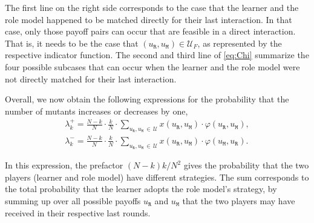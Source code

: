 \documentclass[11pt]{article}
\def\resident{\texttt{R}}
\def\mutant{\texttt{M}}
\theoremstyle{plainCl1}
\theoremstyle{plainCl2}
\begin{document}

\noindent
The first line on the right side corresponds to the case that the learner and
the role model happened to be matched directly for their last interaction. 
In that case, only those payoff pairs can occur that are feasible in a direct interaction. 
That is, it needs to be the case that $(u_\resident,u_\mutant)\in \mathcal{U}_F$, as represented by the respective indicator function. 
The second and third line of \eqref{eq:Chi} summarize the four possible subcases that can occur when the learner and the role model were not directly matched for their last interaction. 

Overall, we now obtain the following expressions for the probability that the number of mutants increases or decreases by one, \begin{equation}
\begin{array}{l}
\displaystyle \lambda^+_k=\frac{N\!-\!k}{N}\cdot \frac{k}{N}\cdot \sum_{u_\resident,u_\mutant\,\in\,\mathcal{U}} x(u_\resident,u_\mutant)\cdot \varphi(u_\resident,u_\mutant), \\[0.5cm]
\displaystyle \lambda^-_k=\frac{N\!-\!k}{N}\cdot \frac{k}{N}\cdot \sum_{u_\resident,u_\mutant \,\in\, \mathcal{U}} x(u_\resident,u_\mutant)\cdot \varphi(u_\mutant,u_\resident).
\end{array}
\end{equation}

\noindent
In this expression, the prefactor $(N\!-\!k)k/N^2$ gives the probability that the two players (learner and role model) have different strategies. 
The sum corresponds to the total probability that the learner
adopts the role model's strategy, by summing up over all possible payoffs $u_\resident$ and $u_\mutant$ that
the two players may have received in their respective last rounds. 

\end{document}
